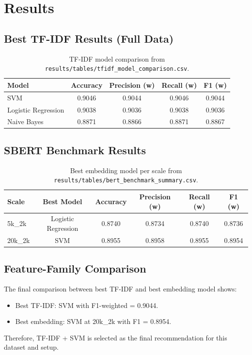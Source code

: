 \documentclass[a4paper,12pt]{article}
\begin{document}
\section{Results}
\subsection{Best TF-IDF Results (Full Data)}
\begin{table}[H]
\centering
\begin{tabular}{lcccc}
\toprule
Model & Accuracy & Precision (w) & Recall (w) & F1 (w) \\
\midrule
SVM & 0.9046 & 0.9044 & 0.9046 & 0.9044 \\
Logistic Regression & 0.9038 & 0.9036 & 0.9038 & 0.9036 \\
Naive Bayes & 0.8871 & 0.8866 & 0.8871 & 0.8867 \\
\bottomrule
\end{tabular}
\caption{TF-IDF model comparison from \texttt{results/tables/tfidf\_model\_comparison.csv}.}
\end{table}

\subsection{SBERT Benchmark Results}
\begin{table}[H]
\centering
\begin{tabular}{lccccc}
\toprule
Scale & Best Model & Accuracy & Precision (w) & Recall (w) & F1 (w) \\
\midrule
5k\_2k & Logistic Regression & 0.8740 & 0.8734 & 0.8740 & 0.8736 \\
20k\_2k & SVM & 0.8955 & 0.8958 & 0.8955 & 0.8954 \\
\bottomrule
\end{tabular}
\caption{Best embedding model per scale from \texttt{results/tables/bert\_benchmark\_summary.csv}.}
\end{table}

\subsection{Feature-Family Comparison}
The final comparison between best TF-IDF and best embedding model shows:
\begin{itemize}[leftmargin=*]
    \item Best TF-IDF: SVM with F1-weighted = 0.9044.
    \item Best embedding: SVM at 20k\_2k with F1 = 0.8954.
\end{itemize}
Therefore, TF-IDF + SVM is selected as the final recommendation for this dataset and setup.
\end{document}
